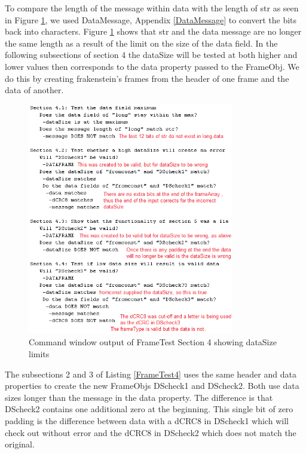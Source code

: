 To compare the length of the message within data with the length of str as seen in Figure \ref{fig:FrameTest4}, we used DataMessage, Appendix \ref{DataMessage} to convert the bits back into characters.  Figure \ref{fig:FrameTest4} shows that str and the data message are no longer the same length as a result of the limit on the size of the data field. In the following subsections of section 4 the dataSize will be tested at both higher and lower values then corresponds to the data property passed to the FrameObj. We do this by creating frakenstein's frames from the header of one frame and the data of another. 

\begin{figure}[!]
    \includegraphics[width=0.8\textwidth, left]{FrameTest4.PNG}
    \caption{Command window output of FrameTest Section 4 showing dataSize limits  }
    \label{fig:FrameTest4}
\end{figure}

The subsections 2 and 3 of Listing \ref{FrameTest4} uses the same header and data properties to create the new FrameObjs DScheck1 and DScheck2. Both use data sizes longer than the message in the data property. The difference is that DScheck2 contains one additional zero at the beginning. This single bit of zero padding is the difference between data with a dCRC8 in DScheck1 which will check out without error and the dCRC8 in DScheck2 which does not match the original.  

